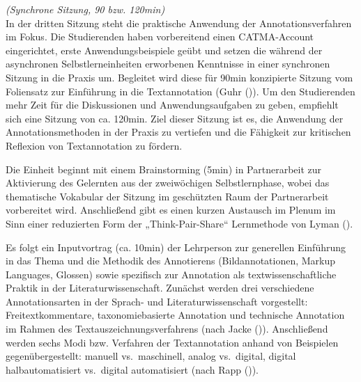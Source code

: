 \documentclass[
          a4paper,
        ]{article}
\begin{document}
\emph{(Synchrone Sitzung, 90 bzw. 120min)}\\
In der dritten Sitzung steht die praktische Anwendung der
Annotationsverfahren im Fokus. Die Studierenden haben vorbereitend einen
CATMA-Account eingerichtet, erste Anwendungsbeispiele geübt und setzen
die während der asynchronen Selbstlerneinheiten erworbenen Kenntnisse in
einer synchronen Sitzung in die Praxis um. Begleitet wird diese für
90min konzipierte Sitzung vom Foliensatz zur Einführung in die
Textannotation (Guhr
()). Um den
Studierenden mehr Zeit für die Diskussionen und Anwendungsaufgaben zu
geben, empfiehlt sich eine Sitzung von ca. 120min. Ziel dieser Sitzung
ist es, die Anwendung der Annotationsmethoden in der Praxis zu vertiefen
und die Fähigkeit zur kritischen Reflexion von Textannotation zu
fördern.

Die Einheit beginnt mit einem Brainstorming (5min) in Partnerarbeit zur
Aktivierung des Gelernten aus der zweiwöchigen Selbstlernphase, wobei
das thematische Vokabular der Sitzung im geschützten Raum der
Partnerarbeit vorbereitet wird. Anschließend gibt es einen kurzen
Austausch im Plenum im Sinn einer reduzierten Form der
„Think-Pair-Share`` Lernmethode von Lyman
().

Es folgt ein Inputvortrag (ca. 10min) der Lehrperson zur generellen
Einführung in das Thema und die Methodik des Annotierens
(Bildannotationen, Markup Languages, Glossen) sowie spezifisch zur
Annotation als textwissenschaftliche Praktik in der
Literaturwissenschaft. Zunächst werden drei verschiedene
Annotationsarten in der Sprach- und Literaturwissenschaft vorgestellt:
Freitextkommentare, taxonomiebasierte Annotation und technische
Annotation im Rahmen des Textauszeichnungsverfahrens (nach Jacke
()).
Anschließend werden sechs Modi bzw. Verfahren der Textannotation anhand
von Beispielen gegenübergestellt: manuell vs.~maschinell, analog
vs.~digital, digital halbautomatisiert vs.~digital automatisiert (nach
Rapp ()).
\end{document}
